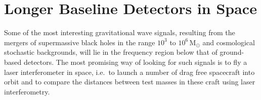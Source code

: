 \documentclass{article}
\begin{document}




\newpage

\section{Longer Baseline Detectors in Space}
\label{section:space}

Some of the most interesting gravitational wave signals, resulting from the
mergers of supermassive black holes in the range $10^3$ to $10^6$\,M$_{\odot}$
and cosmological stochastic backgrounds, will lie in the frequency region below
that of ground-based detectors. The most promising way of looking for such
signals is to fly a laser interferometer in space, i.e.\ to launch a number of
drag free spacecraft into orbit and to compare the distances between test
masses in these craft using laser interferometry.
\end{document}
